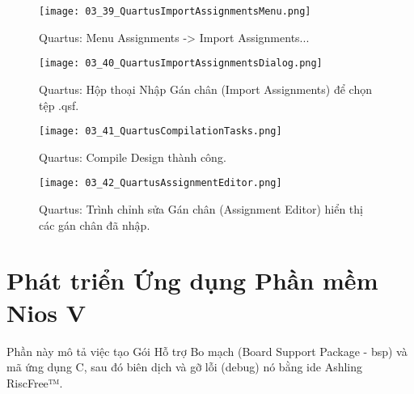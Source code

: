 \begin{figure}[htbp] \centering \texttt{[image: 03\_39\_QuartusImportAssignmentsMenu.png]} \caption{Quartus: Menu Assignments -> Import Assignments...} \label{fig:03_39} \end{figure}
\begin{figure}[htbp] \centering \texttt{[image: 03\_40\_QuartusImportAssignmentsDialog.png]} \caption{Quartus: Hộp thoại Nhập Gán chân (Import Assignments) để chọn tệp .qsf.} \label{fig:03_40} \end{figure}
\begin{figure}[htbp] \centering \texttt{[image: 03\_41\_QuartusCompilationTasks.png]} \caption{Quartus: Compile Design thành công.} \label{fig:03_41} \end{figure}
\begin{figure}[htbp] \centering \texttt{[image: 03\_42\_QuartusAssignmentEditor.png]} \caption{Quartus: Trình chỉnh sửa Gán chân (Assignment Editor) hiển thị các gán chân đã nhập.} \label{fig:03_42} \end{figure}

\FloatBarrier

\section{Phát triển Ứng dụng Phần mềm Nios V}
\label{sec:develop_software}

Phần này mô tả việc tạo Gói Hỗ trợ Bo mạch (Board Support Package - \acrshort{bsp}) và mã ứng dụng C, sau đó biên dịch và gỡ lỗi (debug) nó bằng \acrshort{ide} Ashling RiscFree™.

